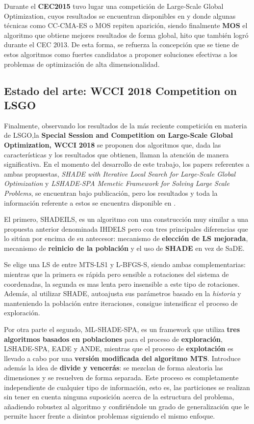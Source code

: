 Durante el \textbf{CEC2015} tuvo lugar una competición de Large-Scale Global Optimization, cuyos resultados se encuentran disponibles en \cite{CEC15-Res-LSGO} y donde algunas técnicas como CC-CMA-ES o MOS  repiten aparición, siendo finalmente \textbf{MOS} el algoritmo que obtiene mejores resultados de forma global, hito que también logró durante el CEC 2013. De esta forma, se refuerza la concepción que se tiene de estos algoritmos como fuertes candidatos a proponer soluciones efectivas a los problemas de optimización de alta dimensionalidad.

\subsection{Estado del arte: WCCI 2018 Competition on LSGO}

Finalmente, observando los resultados de la más reciente competición en materia de LSGO,la \textbf{Special Session and Competition on Large-Scale Global Optimization, WCCI 2018} se proponen dos algoritmos que, dada las características y los resultados que obtienen, llaman la atención de manera significativa. En el momento del desarrollo de este trabajo, los papers referentes a ambas propuestas, \textit{SHADE with Iterative Local Search for Large-Scale Global Optimization}\cite{SHADEILS} y \textit{LSHADE-SPA Memetic Framework for Solving Large Scale Problems}\cite{ML-SHADE-SPA}, se encuentran bajo publicación, pero los resultados y toda la información referente a estos se encuentra disponible en \cite{WCCI-SHADEILS}. 

El primero, SHADEILS, es un algoritmo con una construcción muy similar a una propuesta anterior denominada IHDELS\cite{IHDELS} pero con tres principales diferencias que lo sitúan por encima de su antecesor: mecanismo de \textbf{elección de LS mejorada}, mecanismo de \textbf{reinicio de la población} y el uso de \textbf{SHADE}\cite{SHADE} en vez de SaDE\cite{SaDE}. 

Se elige una LS de entre  MTS-LS1\cite{MTS-LSGO} y L-BFGS-S\cite{LBFGSB}, siendo ambas complementarias: mientras que la primera es rápida pero sensible a rotaciones del sistema de coordenadas, la segunda es mas lenta pero insensible a este tipo de rotaciones. Además, al utilizar SHADE, autoajusta sus parámetros basado en la \textit{historia} y manteniendo la población entre iteraciones, consigue intensificar el proceso de exploración. 

Por otra parte el segundo, ML-SHADE-SPA, es un framework que utiliza \textbf{tres algoritmos basados en poblaciones} para el proceso de \textbf{exploración}, LSHADE-SPA, EADE y ANDE, mientras que el proceso de \textbf{explotación} es llevado a cabo por una \textbf{versión modificada del algoritmo MTS}. Introduce además la idea de \textbf{divide y vencerás}: se mezclan de forma aleatoria las dimensiones y se resuelven de forma separada. Este proceso es completamente independiente de cualquier tipo de información, esto es, las particiones se realizan sin tener en cuenta ninguna suposición acerca de la estructura del problema, añadiendo robustez al algoritmo y confiriéndole un grado de generalización que le permite hacer frente a disintos problemas siguiendo el mismo enfoque.

